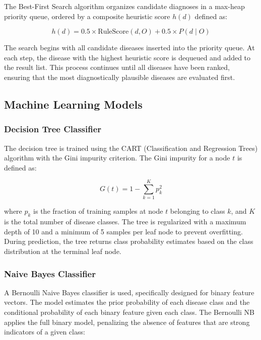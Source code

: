 \documentclass[12pt,a4paper]{article}
\begin{document}
The Best-First Search algorithm organizes candidate diagnoses in a max-heap priority queue, ordered by a composite heuristic score $h(d)$ defined as:

\begin{equation}
    h(d) = 0.5 \times \text{RuleScore}(d, O) + 0.5 \times P(d \mid O)
\end{equation}

The search begins with all candidate diseases inserted into the priority queue. At each step, the disease with the highest heuristic score is dequeued and added to the result list. This process continues until all diseases have been ranked, ensuring that the most diagnostically plausible diseases are evaluated first.

\subsection{Machine Learning Models}

\subsubsection{Decision Tree Classifier}

The decision tree is trained using the CART (Classification and Regression Trees) algorithm \cite{breiman} with the Gini impurity criterion. The Gini impurity for a node $t$ is defined as:

\begin{equation}
    G(t) = 1 - \sum_{k=1}^{K} p_k^2
\end{equation}

where $p_k$ is the fraction of training samples at node $t$ belonging to class $k$, and $K$ is the total number of disease classes. The tree is regularized with a maximum depth of 10 and a minimum of 5 samples per leaf node to prevent overfitting. During prediction, the tree returns class probability estimates based on the class distribution at the terminal leaf node.

\subsubsection{Naive Bayes Classifier}

A Bernoulli Naive Bayes classifier is used, specifically designed for binary feature vectors. The model estimates the prior probability of each disease class and the conditional probability of each binary feature given each class. The Bernoulli NB applies the full binary model, penalizing the absence of features that are strong indicators of a given class:
\end{document}
